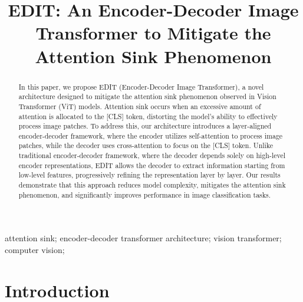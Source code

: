 \documentclass[anon,12pt]{colt2024} %
\title[Short Title]{
  EDIT: An Encoder-Decoder Image Transformer to Mitigate the Attention Sink Phenomenon
  }
\begin{document}
\maketitle

\begin{abstract}%

In this paper, we propose EDIT (Encoder-Decoder Image Transformer), a novel architecture designed to mitigate the attention sink phenomenon observed in Vision Transformer (ViT) models. 
Attention sink occurs when an excessive amount of attention is allocated to the [CLS] token, distorting the model's ability to effectively process image patches. 
To address this, our architecture introduces a layer-aligned encoder-decoder framework, where the encoder utilizes self-attention to process image patches, while the decoder uses cross-attention to focus on the [CLS] token. 
Unlike traditional encoder-decoder framework, where the decoder depends solely on high-level encoder representations, EDIT allows the decoder to extract information starting from low-level features, progressively refining the representation layer by layer. 
Our results demonstrate that this approach reduces model complexity, mitigates the attention sink phenomenon, and significantly improves performance in image classification tasks.

\end{abstract}

\begin{keywords}%
  attention sink; encoder-decoder transformer architecture; vision transformer; computer vision; %
\end{keywords}

\section{Introduction}
\end{document}
